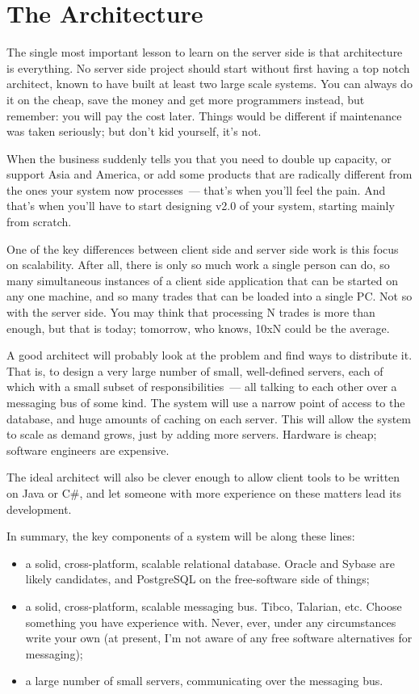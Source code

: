 \documentclass{book}
\begin{document}
\section{The Architecture}

The single most important lesson to learn on the server side is that
architecture is everything. No server side project should start
without first having a top notch architect, known to have built at
least two large scale systems. You can always do it on the cheap, save
the money and get more programmers instead, but remember: you will pay
the cost later. Things would be different if maintenance was taken
seriously; but don't kid yourself, it's not.

When the business suddenly tells you that you need to double up
capacity, or support Asia and America, or add some products that are
radically different from the ones your system now processes~--- that's
when you'll feel the pain. And that's when you'll have to start
designing v2.0 of your system, starting mainly from scratch.

One of the key differences between client side and server side work is
this focus on scalability. After all, there is only so much work a
single person can do, so many simultaneous instances of a client side
application that can be started on any one machine, and so many trades
that can be loaded into a single PC. Not so with the server side. You
may think that processing N trades is more than enough, but that is
today; tomorrow, who knows, 10xN could be the average.

A good architect will probably look at the problem and find ways to
distribute it. That is, to design a very large number of small,
well-defined servers, each of which with a small subset of
responsibilities~--- all talking to each other over a messaging bus of
some kind. The system will use a narrow point of access to the
database, and huge amounts of caching on each server. This will allow
the system to scale as demand grows, just by adding more
servers. Hardware is cheap; software engineers are expensive.

The ideal architect will also be clever enough to allow client tools
to be written on Java or C\#, and let someone with more experience on
these matters lead its development.

In summary, the key components of a system will be along these lines:

\begin{itemize}
\item a solid, cross-platform, scalable relational database. Oracle
  and Sybase are likely candidates, and PostgreSQL on the
  free-software side of things;
\item a solid, cross-platform, scalable messaging bus. Tibco,
  Talarian, etc. Choose something you have experience with. Never,
  ever, under any circumstances write your own (at present, I'm not
  aware of any free software alternatives for messaging);
\item a large number of small servers, communicating over the
  messaging bus.
\end{itemize}
\end{document}
